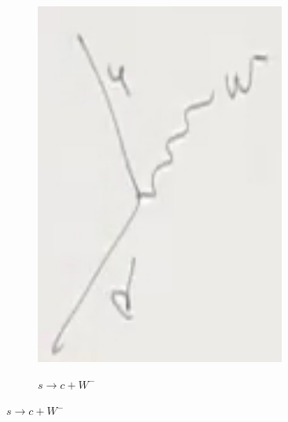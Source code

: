 \documentclass[]{article}
\begin{document}
\begin{figure}[H]
\begin{subfigure}[t]{0.2\textwidth}
		\includegraphics[width=0.9\textwidth]{2-5-W2}
	\end{subfigure}
	\begin{subfigure}[t]{0.2\textwidth}
		\caption{$s \rightarrow c + W^-$}

\end{subfigure}
\end{figure}
\end{document}
